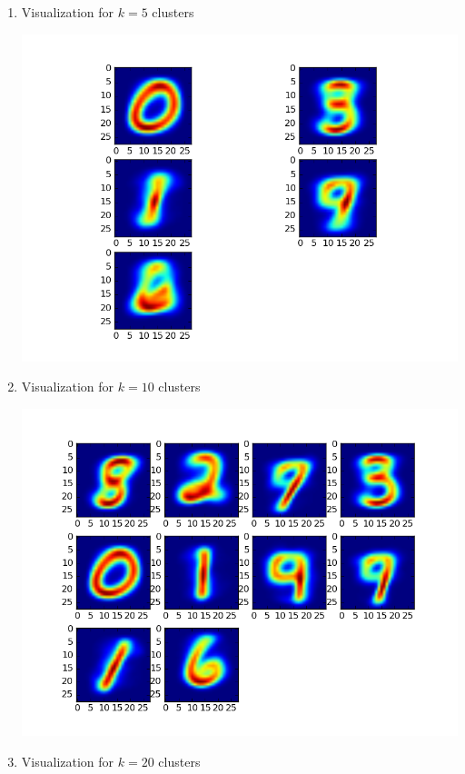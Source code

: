 \documentclass{article}
\begin{document}
\begin{enumerate}
  \item Visualization for $k=5$ clusters
    \begin{center}
      \includegraphics[scale=0.5]{kmeans_5}
    \end{center}
  \item Visualization for $k=10$ clusters
    \begin{center}
      \includegraphics[scale=0.5]{kmeans_10}
    \end{center}
  \item Visualization for $k=20$ clusters
    \begin{center}

\end{center}
\end{enumerate}
\end{document}

